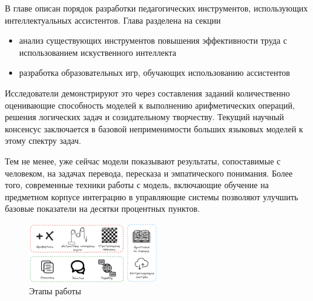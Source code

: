 В главе описан порядок разработки  педагогических инструментов, использующих интеллектуальных ассистентов. Глава разделена на секции 
\begin{itemize}
    \item анализ существующих инструментов повышения эффективности труда с использованием искуственного интеллекта
    \item разработка образовательных игр, обучающих использованию ассистентов 
\end{itemize}


Исследователи демонстрируют это через составления заданий количественно оценивающие способность моделей к выполнению арифметических операций, решения логических задач и созидательному творчеству. Текущий научный консенсус заключается в базовой неприменимости больших языковых моделей к этому спектру задач.

Тем не менее, уже сейчас модели показывают результаты, сопоставимые с человеком, на задачах перевода, пересказа и эмпатического понимания. Более того, современные техники работы с модель, включающие 
обучение на предметном корпусе 
интеграцию в управляющие системы
позволяют улучшить базовые показатели на десятки процентных пунктов.

\begin{figure}[h]
    \centering
    \includegraphics[width=0.5\textwidth]{assets/work/arch/problems.excalidraw.png}
    \caption{Этапы работы}
    \label{optimization}
\end{figure}
